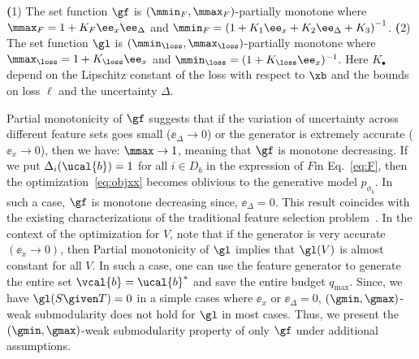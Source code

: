 \documentclass[letterpaper]{article}
\renewcommand{\cite}{\citep}
\begin{document}
\begin{theorem}
\label{thm:mon}
\textbf(1) The set function $\gf$  is $(\mmin_F,\mmax_F)$-partially monotone where  $\mmax_F = 1+ {K}_F\ee_x \ee_{\Delta }$ and $\mmin_F = \left(1+ {K}_1\ee_x +  {K}_2 \ee_{\Delta } +  {K}_3\right)^{-1}$.
\textbf(2) The set function $\gl$  is
$(\mmin_\loss,\mmax_\loss)$-partially monotone where  $\mmax_\loss = 1+ {K}_\loss\ee_x$ and $\mmin_\loss =
( 1+ {K}_\loss\ee_x)^{-1}$.
%
Here ${K}_{\bullet}$ depend on the Lipschitz constant of the loss with respect to $\xb$ and the bounds  on loss $\ell$ and the uncertainty $\Delta$.
\end{theorem}
Partial monotonicity of $\gf$ suggests that if the variation of uncertainty across different feature sets goes small ($\ee_{\Delta} \to 0$) or the generator is extremely accurate  ($\ee_x \to 0$), then we have: $\mmax \to 1$, meaning that $\gf$ is monotone decreasing.
%
If we put $\Delta_i(\ucal{b}) = 1$ for all $i\in D_b$ in the expression of $F$in Eq.~\eqref{eq:F}, then the optimization~\eqref{eq:objxx} becomes  oblivious to the generative model $p_{\phi_b}$.
In such a case,  $\gf$ is monotone decreasing since, $\ee_\Delta = 0$. This result coincides with the existing characterizations of the traditional feature selection problem~\cite{elenberg2018restricted}.
In the context of the optimization for $V$, note that if the generator is very accurate $(\ee_x \to 0)$, then Partial monotonicity of $\gl$ implies that $\gl(V) $ is almost constant for all $V$. In such a case, one can use the feature generator to generate the entire set  $\vcal{b}=\ucal{b}^*$ and save the entire budget $q_{\max}$. Since, we have $\gl(S \given T) = 0$ in a simple cases where $\ee_x $ or $\ee_\Delta = 0$, $(\gmin,\gmax)$-weak submodularity does not hold for $\gl$ in most cases. Thus, we present the $(\gmin,\gmax)$-weak submodularity property of only $\gf$ under additional assumptions.
%
\end{document}
